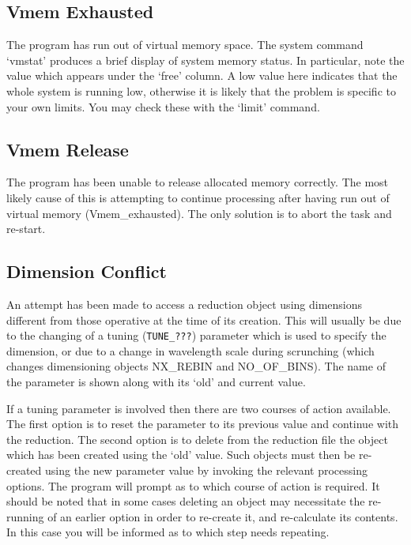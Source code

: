\subsection{ Vmem Exhausted}

The program has run out of virtual memory space. The system command
`vmstat' produces a brief display of system memory status.
In particular, note the value which appears under the `free' column.
A low value here indicates that the whole system is running low,
otherwise it is likely that the problem is specific to your own
limits.  You may check these with the `limit' command.

\subsection{ Vmem Release}

The program has been unable to release allocated memory correctly. The
most likely cause of this is attempting to continue processing after
having run out of virtual memory (Vmem\_exhausted). The only solution is
to abort the task and re-start.

\subsection{ Dimension Conflict}

An attempt has been made to access a reduction object using dimensions
different from those operative at the time of its creation. This will
usually be due to the changing of a tuning (\verb+TUNE_???+) parameter
which is used to specify the dimension, or due to a change in wavelength
scale during scrunching (which changes dimensioning objects NX\_REBIN
and NO\_OF\_BINS). The name of the parameter is shown along with its
`old' and current value.

If a tuning parameter is involved then there are two courses of action
available. The first option is to reset the parameter to its previous
value and continue with the reduction. The second option is to delete
from the reduction file the object which has been created using the
`old' value. Such objects must then be re-created using the new
parameter value by invoking the relevant processing options. The program
will prompt as to which course of action is required. It should
be noted that in some cases deleting an object may necessitate the
re-running of an earlier option in order to re-create it, and
re-calculate its contents.
In this case you will be informed as to which step needs repeating.

